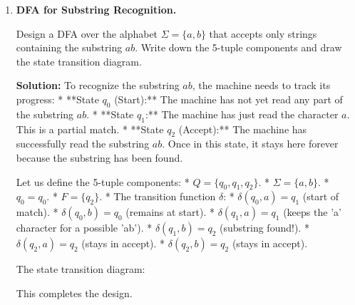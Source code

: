 \documentclass[12pt, a4paper]{book}
\begin{document}
\begin{problembox}
\begin{enumerate}[label=\textbf{E\arabic*.}]
  \item \textbf{DFA for Substring Recognition.}
  
        Design a DFA over the alphabet $\Sigma = \{a, b\}$ that accepts only strings containing the substring $ab$.
        Write down the 5-tuple components and draw the state transition diagram.
        
        \textbf{Solution:}
        To recognize the substring $ab$, the machine needs to track its progress:
        * **State $q_0$ (Start):** The machine has not yet read any part of the substring $ab$.
        * **State $q_1$:** The machine has just read the character $a$. This is a partial match.
        * **State $q_2$ (Accept):** The machine has successfully read the substring $ab$. Once in this state, it stays here forever because the substring has been found.
        
        Let us define the 5-tuple components:
        * $Q = \{q_0, q_1, q_2\}$.
        * $\Sigma = \{a, b\}$.
        * $q_0 = q_0$.
        * $F = \{q_2\}$.
        * The transition function $\delta$:
          * $\delta(q_0, a) = q_1$ (start of match).
          * $\delta(q_0, b) = q_0$ (remains at start).
          * $\delta(q_1, a) = q_1$ (keeps the 'a' character for a possible 'ab').
          * $\delta(q_1, b) = q_2$ (substring found!).
          * $\delta(q_2, a) = q_2$ (stays in accept).
          * $\delta(q_2, b) = q_2$ (stays in accept).
          
        The state transition diagram:
        \begin{center}
        \end{center}
        This completes the design.
        

\end{enumerate}
\end{problembox}
\end{document}
